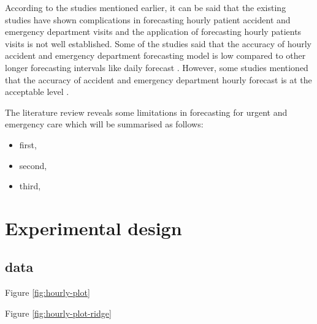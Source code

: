 \documentclass[]{elsarticle} %
\providecommand{\tightlist}{%
  \setlength{\itemsep}{0pt}\setlength{\parskip}{0pt}}
\begin{document}
According to the studies mentioned earlier, it can be said that the existing studies have shown complications in forecasting hourly patient accident and emergency department visits and the application of forecasting hourly patients visits is not well established. Some of the studies said that the accuracy of hourly accident and emergency department forecasting model is low compared to other longer forecasting intervals like daily forecast \citep{boyle2012predicting, hertzum2017forecasting}. However, some studies mentioned that the accuracy of accident and emergency department hourly forecast is at the acceptable level \citep{choudhury2020forecasting, mccarthy2008challenge, schweigler2009forecasting}.

The literature review reveals some limitations in forecasting for urgent and emergency care which will be summarised as follows:

\begin{itemize}
\tightlist
\item
  first,
\item
  second,
\item
  third,
\end{itemize}

\hypertarget{design}{%
\section{Experimental design}\label{design}}

\hypertarget{data}{%
\subsection{data}\label{data}}

Figure \ref{fig:hourly-plot}

Figure \ref{fig:hourly-plot-ridge}
\end{document}
